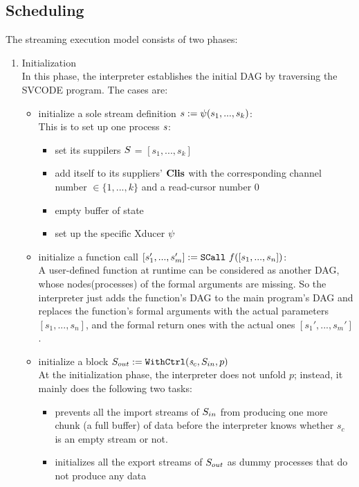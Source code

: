 \subsection{Scheduling}
The streaming execution model consists of two phases:
\begin{enumerate}[(1)]
\item Initialization \\
In this phase, the interpreter establishes the initial DAG by traversing the SVCODE program. The cases are:
\begin{itemize}
	\item initialize a sole stream definition $\sdef{s}{\lcall(s_1,...,s_k)}$: \\
	This is to set up one process $\s$:
	\begin{itemize}
		\item set its suppilers $\S$ = $[s_1,...,s_k]$
		\item add itself to its suppliers' $\clis$ with the corresponding channel number $\in \{1,...,k\}$ and a read-cursor number 0
		\item empty buffer of state \filling
		\item set up the specific Xducer $\lcall$
	\end{itemize}

	
	\item initialize a function call  $\scall{f}{[s_1,...,s_n]}{[s_1',...,s_m']}$: \\
	A user-defined function at runtime can be considered as another DAG, whose nodes(processes) of the formal arguments are missing. 
	So the interpreter just adds the function's DAG to the main program's DAG 
	and replaces the function's formal arguments with the actual parameters $[s_1,...,s_n]$, and the formal return ones with the actual ones $[s_1',...,s_m']$.  

	
	\item initialize a \wc block $\withctrl{\s_c}{p}{\Sin}{\Sout}$ \\
	At the initialization phase, the interpreter does not unfold $p$; instead, it mainly does the following two tasks:	
	\begin{itemize}
		\item prevents all the import streams of $\Sin$ from producing one more chunk (a full buffer) of data before the interpreter knows whether $s_c$ is an empty stream or not.
		\item initializes all the export streams of $\Sout$ as dummy processes that do not produce any data
	\end{itemize}


\end{itemize}
\end{enumerate}
